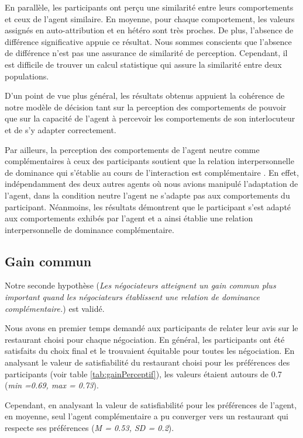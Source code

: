 En parallèle, les participants ont perçu une similarité entre leurs comportements et ceux de l'agent similaire. En moyenne, pour chaque comportement, les valeurs assignés en auto-attribution et en hétéro sont très proches. De plus, l'absence de différence significative appuie ce résultat. Nous sommes conscients que l'absence de différence n'est pas une assurance de similarité de perception. Cependant, il est difficile de trouver un calcul statistique qui assure la similarité entre deux populations.

D’un point de vue plus général, les résultats obtenus appuient la cohérence de notre modèle de décision tant sur la perception des comportements de pouvoir que sur la capacité de l'agent à percevoir les comportements de son interlocuteur et de s'y adapter correctement.  
  
Par ailleurs, la perception des comportements de l'agent neutre comme complémentaires à ceux des participants soutient que la relation interpersonnelle de dominance qui s'établie au cours de l'interaction est complémentaire \cite{burgoonnonverbal}. En effet, indépendamment des deux autres agents où nous avions manipulé l'adaptation de l'agent, dans la condition neutre l'agent ne s'adapte pas aux comportements du participant. Néanmoins, les résultats démontrent que le participant s'est adapté aux comportements exhibés par l'agent et a ainsi établie une relation interpersonnelle de dominance complémentaire.

\subsection{Gain commun}
	Notre seconde hypothèse (\textit{Les négociateurs atteignent un gain commun plus important quand les négociateurs établissent une relation de dominance complémentaire.}) est validé. 
	
	Nous avons en premier temps demandé aux participants de relater leur avis sur le restaurant choisi pour chaque négociation.
	En général, les participants ont été satisfaits du choix final et le trouvaient équitable pour toutes les négociation. 
	En analysant le valeur de satisfiabilité du restaurant choisi pour les préférences des participants (voir table \ref{tab:gainPerceptif}), les valeurs étaient autours de 0.7 (\emph{min =0.69, max = 0.73}). 
	
	Cependant, en analysant la valeur de satisfiabilité pour les préférences de l'agent,  en moyenne, seul l'agent complémentaire a pu converger vers un restaurant qui respecte ses préférences (\emph{M = 0.53, SD = 0.2}). 
	

